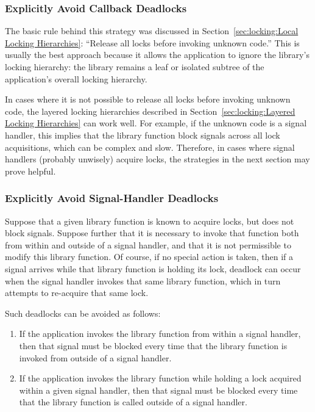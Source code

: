 \subsubsection{Explicitly Avoid Callback Deadlocks}
\label{sec:locking:Explicitly Avoid Callback Deadlocks}

The basic rule behind this strategy was discussed in
Section~\ref{sec:locking:Local Locking Hierarchies}: ``Release all
locks before invoking unknown code.''
This is usually the best approach because it allows the application to
ignore the library's locking hierarchy: the library remains a leaf or
isolated subtree of the application's overall locking hierarchy.

In cases where it is not possible to release all locks before invoking
unknown code, the layered locking hierarchies described in
Section~\ref{sec:locking:Layered Locking Hierarchies} can work well.
For example, if the unknown code is a signal handler, this implies that
the library function block signals across all lock acquisitions, which
can be complex and slow.
Therefore, in cases where signal handlers (probably unwisely) acquire
locks, the strategies in the next section may prove helpful.

\subsubsection{Explicitly Avoid Signal-Handler Deadlocks}
\label{sec:locking:Explicitly Avoid Signal-Handler Deadlocks}

Suppose that a given library function is known to acquire locks,
but does not block signals.
Suppose further that it is necessary to invoke that function both from
within and outside of a signal handler, and that it is not permissible
to modify this library function.
Of course, if no special action is taken, then if a signal arrives
while that library function is holding its lock, deadlock can occur
when the signal handler invokes that same library function,
which in turn attempts to re-acquire that same lock.

Such deadlocks can be avoided as follows:

\begin{enumerate}
\item	If the application invokes the library function from
	within a signal handler, then that signal must be blocked
	every time that the library function is invoked from outside
	of a signal handler.
\item	If the application invokes the library function
	while holding a lock acquired within a given signal
	handler, then that signal must be blocked every time that the
	library function is called outside of a signal handler.
\end{enumerate}

